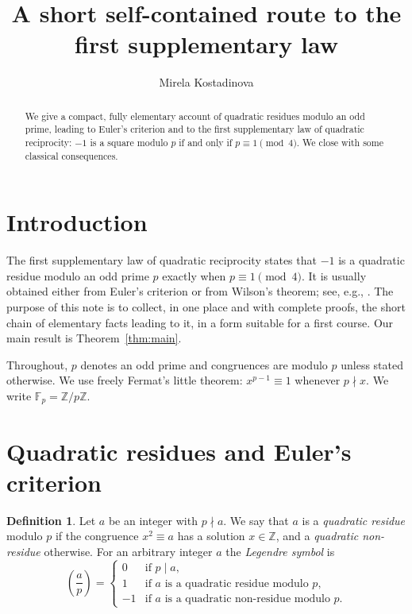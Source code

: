 \documentclass[11pt]{amsart}
\title{A short self-contained route to the first supplementary law}
\author{Mirela Kostadinova}
\date{}
\theoremstyle{definition}
\newtheorem{definition}[theorem]{Definition}
\theoremstyle{remark}
\newcommand{\leg}[2]{\left(\frac{#1}{#2}\right)}
\begin{document}
\begin{abstract}
We give a compact, fully elementary account of quadratic residues modulo an odd
prime, leading to Euler's criterion and to the first supplementary law of
quadratic reciprocity: $-1$ is a square modulo $p$ if and only if
$p\equiv 1 \pmod 4$. We close with some classical consequences.
\end{abstract}

\maketitle

\section{Introduction}

The first supplementary law of quadratic reciprocity states that $-1$ is a
quadratic residue modulo an odd prime $p$ exactly when $p \equiv 1 \pmod 4$.
It is usually obtained either from Euler's criterion or from Wilson's theorem; see, e.g., \cite[Ch.~5]{IR}.
The purpose of this note is to collect, in one place and with complete proofs,
the short chain of elementary facts leading to it, in a form suitable for a
first course. Our main result is Theorem~\ref{thm:main}.

Throughout, $p$ denotes an odd prime and congruences are modulo $p$ unless
stated otherwise. We use freely Fermat's little theorem: $x^{p-1}\equiv 1$
whenever $p\nmid x$. We write $\mathbb{F}_p=\mathbb{Z}/p\mathbb{Z}$.

\section{Quadratic residues and Euler's criterion}

\begin{definition}\label{def:qr}
Let $a$ be an integer with $p \nmid a$. We say that $a$ is a
\emph{quadratic residue} modulo $p$ if the congruence $x^2 \equiv a$ has a
solution $x\in\mathbb{Z}$, and a \emph{quadratic non-residue} otherwise. For
an arbitrary integer $a$ the \emph{Legendre symbol} is
\[
\leg{a}{p} =
\begin{cases}
0 & \text{if } p \mid a,\\
1 & \text{if } a \text{ is a quadratic residue modulo } p,\\
-1 & \text{if } a \text{ is a quadratic non-residue modulo } p.
\end{cases}
\]
\end{definition}
\end{document}
